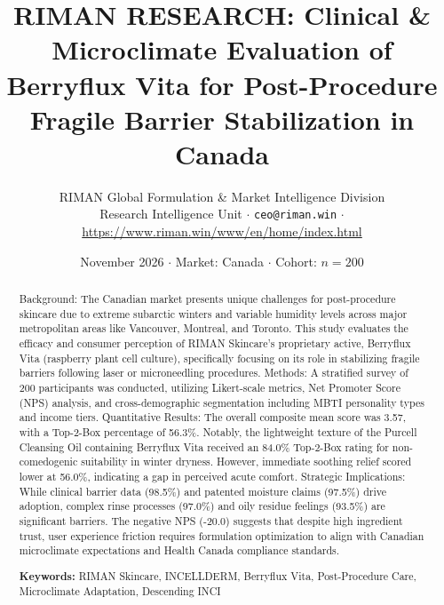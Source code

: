 \documentclass[10pt,twocolumn,a4paper]{article}
\title{\textbf{RIMAN RESEARCH: Clinical \& Microclimate Evaluation of Berryflux Vita for Post-Procedure Fragile Barrier Stabilization in Canada}}
\author{RIMAN Global Formulation \& Market Intelligence Division\\
\small Research Intelligence Unit $\cdot$ \texttt{ceo@riman.win} $\cdot$ \url{https://www.riman.win/www/en/home/index.html}}
\date{November 2026 \quad $\cdot$ \quad Market: Canada \quad $\cdot$ \quad Cohort: $n = 200$}
\begin{document}
\maketitle

\begin{abstract}
Background: The Canadian market presents unique challenges for post-procedure skincare due to extreme subarctic winters and variable humidity levels across major metropolitan areas like Vancouver, Montreal, and Toronto. This study evaluates the efficacy and consumer perception of RIMAN Skincare's proprietary active, Berryflux Vita (raspberry plant cell culture), specifically focusing on its role in stabilizing fragile barriers following laser or microneedling procedures. Methods: A stratified survey of 200 participants was conducted, utilizing Likert-scale metrics, Net Promoter Score (NPS) analysis, and cross-demographic segmentation including MBTI personality types and income tiers. Quantitative Results: The overall composite mean score was 3.57, with a Top-2-Box percentage of 56.3\%. Notably, the lightweight texture of the Purcell Cleansing Oil containing Berryflux Vita received an 84.0\% Top-2-Box rating for non-comedogenic suitability in winter dryness. However, immediate soothing relief scored lower at 56.0\%, indicating a gap in perceived acute comfort. Strategic Implications: While clinical barrier data (98.5\%) and patented moisture claims (97.5\%) drive adoption, complex rinse processes (97.0\%) and oily residue feelings (93.5\%) are significant barriers. The negative NPS (-20.0) suggests that despite high ingredient trust, user experience friction requires formulation optimization to align with Canadian microclimate expectations and Health Canada compliance standards.

\vspace{0.4em}
\noindent\textbf{Keywords:} RIMAN Skincare, INCELLDERM, Berryflux Vita, Post-Procedure Care, Microclimate Adaptation, Descending INCI
\end{abstract}
\end{document}
